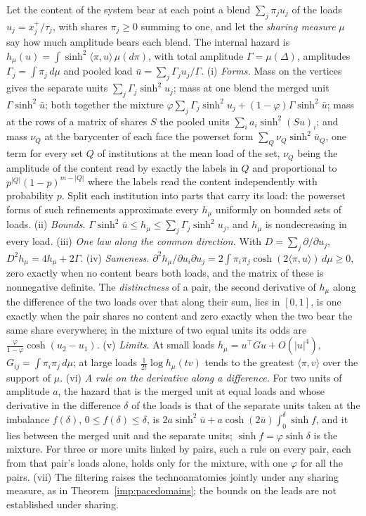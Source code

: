 \begin{proposition}\label{imp:sharing}
Let the content of the system bear at each point a blend
$\sum_j\pi_ju_j$ of the loads $u_j=x_j^+/\tau_j$, with shares $\pi_j\ge0$
summing to one, and let the \emph{sharing measure} $\mu$ say how much
amplitude bears each blend. The internal hazard is
$h_\mu(u)=\int\sinh^2\langle\pi,u\rangle\,\mu(d\pi)$, with total amplitude
$\Gamma=\mu(\Delta)$, amplitudes $\Gamma_j=\int\pi_j\,d\mu$ and pooled load
$\bar u=\sum_j\Gamma_ju_j/\Gamma$. (i) \emph{Forms.} Mass on the vertices
gives the separate units $\sum_j\Gamma_j\sinh^2u_j$; mass at one blend the
merged unit $\Gamma\sinh^2\bar u$; both together the mixture
$\varphi\sum_j\Gamma_j\sinh^2u_j+(1-\varphi)\Gamma\sinh^2\bar u$; mass at
the rows of a matrix of shares $S$ the pooled units
$\sum_ia_i\sinh^2(Su)_i$; and mass $\nu_Q$ at the barycenter of each face
the powerset form $\sum_Q\nu_Q\sinh^2\bar u_Q$, one term for every set
$Q$ of institutions at the mean load of the set, $\nu_Q$ being the
amplitude of the content read by exactly the labels in $Q$ and
proportional to $p^{|Q|}(1-p)^{m-|Q|}$ where the labels read the content
independently with probability $p$. Split each institution into parts
that carry its load: the powerset forms of such refinements approximate
every $h_\mu$ uniformly on bounded sets of loads. (ii) \emph{Bounds.}
$\Gamma\sinh^2\bar u\le h_\mu\le\sum_j\Gamma_j\sinh^2u_j$, and $h_\mu$ is
nondecreasing in every load. (iii) \emph{One law along the common
direction.} With $D=\sum_j\partial/\partial u_j$,
$D^2h_\mu=4h_\mu+2\Gamma$. (iv) \emph{Sameness.}
$\partial^2h_\mu/\partial u_i\partial u_j=2\int\pi_i\pi_j\cosh(2\langle\pi,u\rangle)\,d\mu\ge0$,
zero exactly when no content bears both loads, and the matrix of these is
nonnegative definite. The \emph{distinctness} of a pair, the second
derivative of $h_\mu$ along the difference of the two loads over that
along their sum, lies in $[0,1]$, is one exactly when the pair shares no
content and zero exactly when the two bear the same share everywhere; in
the mixture of two equal units its odds are
$\frac{\varphi}{1-\varphi}\cosh(u_2-u_1)$. (v) \emph{Limits.} At small
loads $h_\mu=u^{\!\top}Gu+O(|u|^4)$, $G_{ij}=\int\pi_i\pi_j\,d\mu$; at
large loads $\frac1{2t}\log h_\mu(tv)$ tends to the greatest
$\langle\pi,v\rangle$ over the support of $\mu$. (vi) \emph{A rule on the
derivative along a difference.} For two units of amplitude $a$, the
hazard that is the merged unit at equal loads and whose derivative in the
difference $\delta$ of the loads is that of the separate units taken at
the imbalance $f(\delta)$, $0\le f(\delta)\le\delta$, is
$2a\sinh^2\bar u+a\cosh(2\bar u)\int_0^\delta\sinh f$, and it lies between
the merged unit and the separate units; $\sinh f=\varphi\sinh\delta$ is
the mixture. For three or more units linked by pairs, such a rule on
every pair, each from that pair's loads alone, holds only for the
mixture, with one $\varphi$ for all the pairs. (vii) The filtering raises
the technoanatomies jointly under any sharing measure, as in
Theorem~\ref{imp:pacedomains}; the bounds on the leads are not
established under sharing.
\end{proposition}
